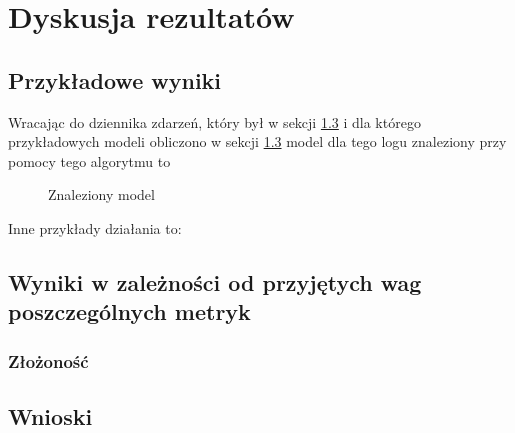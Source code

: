 \chapter{Dyskusja rezultatów}

\section{Przykładowe wyniki}
Wracając do dziennika zdarzeń, który był w sekcji \ref{} i dla którego przykładowych modeli obliczono w sekcji \ref{} model dla tego logu znaleziony przy pomocy tego algorytmu to 
\begin{figure}[!ht]
	\caption{\label{fig:flow_chart}Znaleziony model}
\end{figure}

Inne przykłady działania to: 

\section{Wyniki w zależności od przyjętych wag poszczególnych metryk}

\subsection{Złożoność}

\section{Wnioski}
